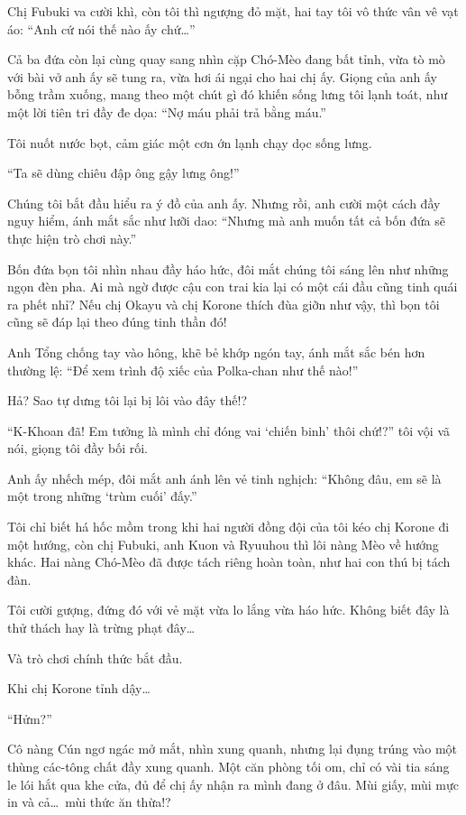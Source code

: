 \documentclass[../main.tex]{subfiles}
\begin{document}
Chị Fubuki va cười khì, còn tôi thì ngượng đỏ mặt, hai tay tôi vô thức vân vê vạt áo: ``Anh cứ nói thế nào ấy chứ\dots''

Cả ba đứa còn lại cùng quay sang nhìn cặp Chó-Mèo đang bất tỉnh, vừa tò mò với bài vở anh ấy sẽ tung ra, vừa hơi ái ngại cho hai chị ấy. Giọng của anh ấy bỗng trầm xuống, mang theo một chút gì đó khiến sống lưng tôi lạnh toát, như một lời tiên tri đầy đe dọa: ``Nợ máu phải trả bằng máu.''

Tôi nuốt nước bọt, cảm giác một cơn ớn lạnh chạy dọc sống lưng.

``Ta sẽ dùng chiêu đập ông gậy lưng ông!''

Chúng tôi bắt đầu hiểu ra ý đồ của anh ấy. Nhưng rồi, anh cười một cách đầy nguy hiểm, ánh mắt sắc như lưỡi dao: ``Nhưng mà anh muốn tất cả bốn đứa sẽ thực hiện trò chơi này.''

Bốn đứa bọn tôi nhìn nhau đầy háo hức, đôi mắt chúng tôi sáng lên như những ngọn đèn pha. Ai mà ngờ được cậu con trai kia lại có một cái đầu cũng tinh quái ra phết nhỉ? Nếu chị Okayu và chị Korone thích đùa giỡn như vậy, thì bọn tôi cũng sẽ đáp lại theo đúng tinh thần đó!

Anh Tổng chống tay vào hông, khẽ bẻ khớp ngón tay, ánh mắt sắc bén hơn thường lệ: ``Để xem trình độ xiếc của Polka-chan như thế nào!''

Hả? Sao tự dưng tôi lại bị lôi vào đây thế!?

``K-Khoan đã! Em tưởng là mình chỉ đóng vai `chiến binh' thôi chứ!?'' tôi vội vã nói, giọng tôi đầy bối rối.

Anh ấy nhếch mép, đôi mắt anh ánh lên vẻ tinh nghịch: ``Không đâu, em sẽ là một trong những `trùm cuối' đấy.''

Tôi chỉ biết há hốc mồm trong khi hai người đồng đội của tôi kéo chị Korone đi một hướng, còn chị Fubuki, anh Kuon và Ryuuhou thì lôi nàng Mèo về hướng khác. Hai nàng Chó-Mèo đã được tách riêng hoàn toàn, như hai con thú bị tách đàn.

Tôi cười gượng, đứng đó với vẻ mặt vừa lo lắng vừa háo hức. Không biết đây là thử thách hay là trừng phạt đây\dots

Và trò chơi chính thức bắt đầu.

\ct

Khi chị Korone tỉnh dậy\dots

``Hửm?''

Cô nàng Cún ngơ ngác mở mắt, nhìn xung quanh, nhưng lại đụng trúng vào một thùng các-tông chất đầy xung quanh. Một căn phòng tối om, chỉ có vài tia sáng le lói hắt qua khe cửa, đủ để chị ấy nhận ra mình đang ở đâu. Mùi giấy, mùi mực in và cả\dots\ mùi thức ăn thừa!?
\end{document}
